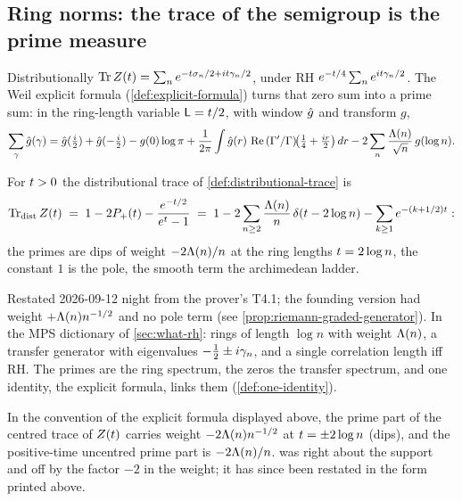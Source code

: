 \subsection{Ring norms: the trace of the semigroup is the prime measure}

Distributionally $\operatorname{Tr}Z(t) = \sum_n e^{-t\sigma_n/2 + it\gamma_{n}/2}$, under RH
$e^{-t/4}\sum_n e^{it\gamma_{n}/2}$. The Weil explicit formula
(\cref{def:explicit-formula}) turns that zero sum into a prime sum: in the ring-length
variable $\mathsf L = t/2$, with window $\hat g$ and transform $g$,
\[
  \sum_{\gamma}\hat g(\gamma) = \hat g(\tfrac i2)+\hat g(-\tfrac i2) - g(0)\log\pi
  + \frac{1}{2\pi}\int\hat g(r)\,\operatorname{Re}\,(\Gamma'/\Gamma)\!\big(\tfrac14+\tfrac{ir}{2}\big)\,dr
  - 2\sum_{n}\frac{\Lambda(n)}{\sqrt n}\,g(\log n).
\]

\begin{proposition}
\label{prop:ringnorm-trace}
For $t>0$ the distributional trace of \cref{def:distributional-trace} is
\[
  \operatorname{Tr}_{\mathrm{dist}}Z(t) \;=\; 1 - 2P_{+}(t) - \frac{e^{-t/2}}{e^{t}-1}
  \;=\; 1 - 2\sum_{n\ge2}\frac{\Lambda(n)}{n}\,\delta(t-2\log n) - \sum_{k\ge1}e^{-(k+1/2)t}:
\]
the primes are dips of weight $-2\Lambda(n)/n$ at the ring lengths $t = 2\log n$, the
constant $1$ is the pole, the smooth term the archimedean ladder.
\end{proposition}

Restated 2026-09-12 night from the prover's T4.1; the founding version had weight
$+\Lambda(n)n^{-1/2}$ and no pole term (see \cref{prop:riemann-graded-generator}). In the MPS dictionary of
\cref{sec:what-rh}: rings of length $\log n$ with weight $\Lambda(n)$, a transfer generator
with eigenvalues $-\tfrac12 \pm i\gamma_{n}$, and a single correlation length iff RH. The
primes are the ring spectrum, the zeros the transfer spectrum, and one identity, the
explicit formula, links them (\cref{def:one-identity}).

\begin{observation}
\label{obs:ringnorm-sign-correction}
In the convention of the explicit formula displayed above, the prime part of the centred
trace of $Z(t)$ carries weight $-2\Lambda(n)n^{-1/2}$ at $t = \pm2\log n$ (dips), and the
positive-time uncentred prime part is $-2\Lambda(n)/n$.  was right
about the support and off by the factor $-2$ in the weight; it has since been restated
in the form printed above.
\end{observation}

